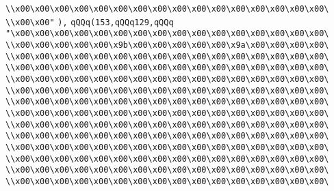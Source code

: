 \verb|\\x00\x00\x00\x00\x00\x00\x00\x00\x00\x00\x00\x00\x00\x00\x00\x00\|\newline
\verb|\\x00\x00"|\newline
\verb|),|\newline
\verb|qQQq(153,qQQq129,qQQq|\newline
\verb|"\x00\x00\x00\x00\x00\x00\x00\x00\x00\x00\x00\x00\x00\x00\x00\x00\|\newline
\verb|\\x00\x00\x00\x00\x00\x9b\x00\x00\x00\x00\x00\x9a\x00\x00\x00\x00\|\newline
\verb|\\x00\x00\x00\x00\x00\x00\x00\x00\x00\x00\x00\x00\x00\x00\x00\x00\|\newline
\verb|\\x00\x00\x00\x00\x00\x00\x00\x00\x00\x00\x00\x00\x00\x00\x00\x00\|\newline
\verb|\\x00\x00\x00\x00\x00\x00\x00\x00\x00\x00\x00\x00\x00\x00\x00\x00\|\newline
\verb|\\x00\x00\x00\x00\x00\x00\x00\x00\x00\x00\x00\x00\x00\x00\x00\x00\|\newline
\verb|\\x00\x00\x00\x00\x00\x00\x00\x00\x00\x00\x00\x00\x00\x00\x00\x00\|\newline
\verb|\\x00\x00\x00\x00\x00\x00\x00\x00\x00\x00\x00\x00\x00\x00\x00\x00\|\newline
\verb|\\x00\x00\x00\x00\x00\x00\x00\x00\x00\x00\x00\x00\x00\x00\x00\x00\|\newline
\verb|\\x00\x00\x00\x00\x00\x00\x00\x00\x00\x00\x00\x00\x00\x00\x00\x00\|\newline
\verb|\\x00\x00\x00\x00\x00\x00\x00\x00\x00\x00\x00\x00\x00\x00\x00\x00\|\newline
\verb|\\x00\x00\x00\x00\x00\x00\x00\x00\x00\x00\x00\x00\x00\x00\x00\x00\|\newline
\verb|\\x00\x00\x00\x00\x00\x00\x00\x00\x00\x00\x00\x00\x00\x00\x00\x00\|\newline
\verb|\\x00\x00\x00\x00\x00\x00\x00\x00\x00\x00\x00\x00\x00\x00\x00\x00\|\newline
